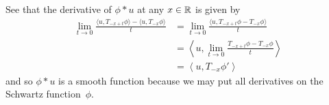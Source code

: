     See that the derivative of $\phi*u$ at any $x\in\mathbb{R}$ is given by
    \begin{align*}
      \lim_{t\rightarrow0} \frac{\langle u, T_{-x+t}\phi\rangle - \langle u, T_{-x}\phi\rangle}{t}
      &= \lim_{t\rightarrow0} \frac{\langle u, T_{-x+t}\phi-T_{-x}\phi\rangle}{t}
      \\&= \left\langle u, \lim_{t\rightarrow0} \frac{T_{-x+t}\phi-T_{-x}\phi}{t}\right\rangle
      \\&= \left\langle u, T_{-x}\phi'\right\rangle
    \end{align*}
    and so $\phi*u$ is a smooth function because we may put all derivatives on the Schwartz function~$\phi$.

%      

